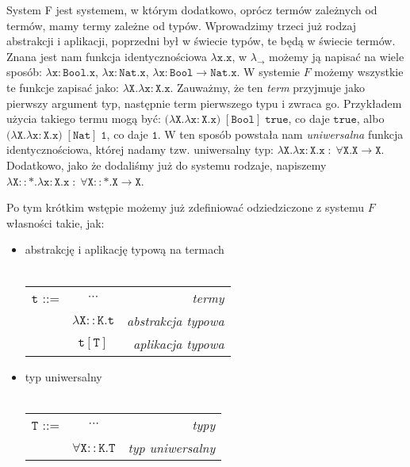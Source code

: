 \documentclass[11pt,leqno]{article}
\begin{document}
System F jest systemem, w którym dodatkowo, oprócz termów zależnych od termów, mamy termy zależne od typów. Wprowadzimy trzeci już rodzaj abstrakcji i aplikacji, poprzedni był w świecie typów, te będą w świecie termów. Znana jest nam funkcja identycznościowa $\mathtt{\lambda x.x}$, w $\lambda_{\rightarrow}$ możemy ją napisać na wiele sposób: $\mathtt{\lambda x:Bool.x}$, $\mathtt{\lambda x:Nat.x}$, $\mathtt{\lambda x:Bool \rightarrow Nat.x}$. W systemie $F$ możemy wszystkie te funkcje zapisać jako: $\mathtt{\lambda X. \lambda x:X.x}$. Zauważmy, że ten \textit{term} przyjmuje jako pierwszy argument typ, następnie term pierwszego typu i zwraca go. Przykładem użycia takiego termu mogą być: $(\mathtt{\lambda X. \lambda x:X.x)\;[Bool]\;true}$, co daje $\mathtt{true}$, albo $(\mathtt{\lambda X. \lambda x:X.x)\;[Nat]\;1}$, co daje $\mathtt{1}$. W ten sposób powstała nam \textit{uniwersalna} funkcja identycznościowa, której nadamy tzw. uniwersalny typ: $\mathtt{\lambda X. \lambda x:X.x \; : \; \forall X.X \rightarrow X}$. Dodatkowo, jako że dodaliśmy już do systemu rodzaje, napiszemy $\mathtt{\lambda X::\ast. \lambda x:X.x \; : \; \forall X::\ast.X \rightarrow X}$. 


Po tym krótkim wstępie możemy już zdefiniować odziedziczone z systemu $F$ własności takie, jak:  
\begin{itemize}
    \item abstrakcję i aplikację typową na termach \\ \\
\begin{tabular}{| l c r |}
  \hline
  $\mathtt{t}$ ::= & $\cdots$ & \textit{termy} \\
   & $\mathtt{\lambda X::K.t}$ & \textit{abstrakcja typowa} \\
   & $\mathtt{t[T]}$ & \textit{aplikacja typowa} \\
  \hline
\end{tabular}

    \item typ uniwersalny \\ \\
\begin{tabular}{| l c r |}
  \hline
  $\mathtt{T}$ ::= & $\cdots$ & \textit{typy}  \\
   & $\mathtt{\forall X::K.T}$ & \textit{typ uniwersalny} \\
  \hline
\end{tabular}

\end{itemize}
\end{document}
